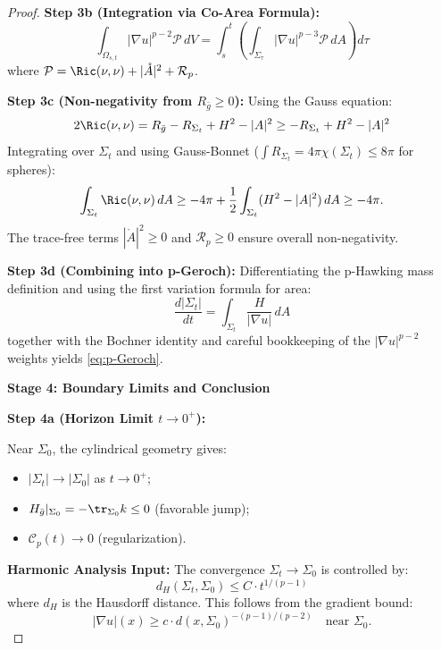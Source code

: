 \begin{proof}
\textbf{Step 3b (Integration via Co-Area Formula):} 
\begin{equation}
\int_{\Omega_{s,t}} |\nabla u|^{p-2} \mathcal{P} \, dV = \int_s^t \left(\int_{\Sigma_\tau} |\nabla u|^{p-3} \mathcal{P} \, dA\right) d\tau
\end{equation}
where $\mathcal{P} = \Ric(\nu,\nu) + |\mathring{A}|^2 + \mathcal{R}_p$.

\textbf{Step 3c (Non-negativity from $R_{\bar{g}} \geq 0$):} Using the Gauss equation:
\begin{equation}
2\Ric(\nu, \nu) = R_{\bar{g}} - R_{\Sigma_t} + H^2 - |A|^2 \geq -R_{\Sigma_t} + H^2 - |A|^2
\end{equation}
Integrating over $\Sigma_t$ and using Gauss-Bonnet ($\int R_{\Sigma_t} = 4\pi \chi(\Sigma_t) \leq 8\pi$ for spheres):
\begin{equation}
\int_{\Sigma_t} \Ric(\nu,\nu) \, dA \geq -4\pi + \frac{1}{2}\int_{\Sigma_t}(H^2 - |A|^2) \, dA \geq -4\pi.
\end{equation}
The trace-free terms $|\mathring{A}|^2 \geq 0$ and $\mathcal{R}_p \geq 0$ ensure overall non-negativity.

\textbf{Step 3d (Combining into p-Geroch):} Differentiating the p-Hawking mass definition and using the first variation formula for area:
\begin{equation}
\frac{d|\Sigma_t|}{dt} = \int_{\Sigma_t} \frac{H}{|\nabla u|} \, dA
\end{equation}
together with the Bochner identity and careful bookkeeping of the $|\nabla u|^{p-2}$ weights yields \eqref{eq:p-Geroch}.

\textbf{Stage 4: Boundary Limits and Conclusion}

\textbf{Step 4a (Horizon Limit $t \to 0^+$):}

Near $\Sigma_0$, the cylindrical geometry gives:
\begin{itemize}
\item $|\Sigma_t| \to |\Sigma_0|$ as $t \to 0^+$;
\item $H_{\bar{g}}|_{\Sigma_0} = -\tr_{\Sigma_0} k \leq 0$ (favorable jump);
\item $\mathcal{C}_p(t) \to 0$ (regularization).
\end{itemize}

\textbf{Harmonic Analysis Input:} The convergence $\Sigma_t \to \Sigma_0$ is controlled by:
\begin{equation}
d_H(\Sigma_t, \Sigma_0) \leq C \cdot t^{1/(p-1)}
\end{equation}
where $d_H$ is the Hausdorff distance. This follows from the gradient bound:
\begin{equation}
|\nabla u|(x) \geq c \cdot d(x, \Sigma_0)^{-(p-1)/(p-2)} \quad \text{near } \Sigma_0.
\end{equation}


\end{proof}
